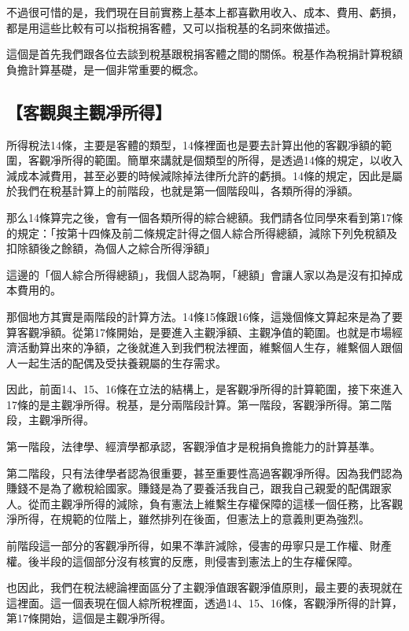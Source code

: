 \documentclass[oneside,sub3section]{ctexbook}
\begin{document}
不過很可惜的是，我們現在目前實務上基本上都喜歡用收入、成本、費用、虧損，都是用這些比較有可以指稅捐客體，又可以指稅基的名詞來做描述。

這個是首先我們跟各位去談到稅基跟稅捐客體之間的關係。稅基作為稅捐計算稅額負擔計算基礎，是一個非常重要的概念。

\hypertarget{ux5ba2ux89c0ux8207ux4e3bux89c0ux51c8ux6240ux5f97}{%
\subsection{【客觀與主觀凈所得】}\label{ux5ba2ux89c0ux8207ux4e3bux89c0ux51c8ux6240ux5f97}}

所得稅法14條，主要是客體的類型，14條裡面也是要去計算出他的客觀凈額的範圍，客觀凈所得的範圍。簡單來講就是個類型的所得，是透過14條的規定，以收入減成本減費用，甚至必要的時候減除掉法律所允許的虧損。14條的規定，因此是屬於我們在稅基計算上的前階段，也就是第一個階段叫，各類所得的淨額。

那么14條算完之後，會有一個各類所得的綜合總額。我們請各位同學來看到第17條的規定：「按第十四條及前二條規定計得之個人綜合所得總額，減除下列免稅額及扣除額後之餘額，為個人之綜合所得淨額」

這邊的「個人綜合所得總額」，我個人認為啊，「總額」會讓人家以為是沒有扣掉成本費用的。

那個地方其實是兩階段的計算方法。14條15條跟16條，這幾個條文算起來是為了要算客觀凈額。從第17條開始，是要進入主觀淨額、主觀净值的範圍。也就是市場經濟活動算出來的净額，之後就進入到我們稅法裡面，維繫個人生存，維繫個人跟個人一起生活的配偶及受扶養親屬的生存需求。

因此，前面14、15、16條在立法的結構上，是客觀凈所得的計算範圍，接下來進入17條的是主觀凈所得。稅基，是分兩階段計算。第一階段，客觀淨所得。第二階段，主觀凈所得。

第一階段，法律學、經濟學都承認，客觀淨值才是稅捐負擔能力的計算基準。

第二階段，只有法律學者認為很重要，甚至重要性高過客觀凈所得。因為我們認為賺錢不是為了繳稅給國家。賺錢是為了要養活我自己，跟我自己親愛的配偶跟家人。從而主觀凈所得的減除，負有憲法上維繫生存權保障的這樣一個任務，比客觀淨所得，在規範的位階上，雖然排列在後面，但憲法上的意義則更為強烈。

前階段這一部分的客觀凈所得，如果不準許減除，侵害的毋寧只是工作權、財產權。後半段的這個部分沒有核實的反應，則侵害到憲法上的生存權保障。

也因此，我們在稅法總論裡面區分了主觀淨值跟客觀淨值原則，最主要的表現就在這裡面。這一個表現在個人綜所稅裡面，透過14、15、16條，客觀淨所得的計算，第17條開始，這個是主觀凈所得。
\end{document}
